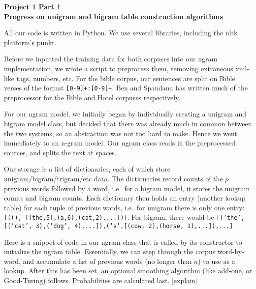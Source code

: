 \documentclass{article}
\begin{document}
\begin{center}\textbf{Project 1 Part 1\\Progress on unigram and bigram table construction algorithms}\end{center}

All our code is written in Python. We use several libraries, including the nltk platform's punkt.\par

Before we inputted the training data for both corpuses into our ngram implementation, we wrote a script to preprocess them, removing extraneous xml-like tags, numbers, etc. For the bible corpus, our sentences are split on Bible verses of the format \texttt{[0-9]+:[0-9]+}. Ben and Spandana has written much of the preprocessor for the Bible and Hotel corpuses respectively.\par

For our ngram model, we initially began by individually creating a unigram and bigram model class, but decided that there was already much in common between the two systems, so an abstraction was not too hard to make. Hence we went immediately to an n-gram model. Our ngram class reads in the preprocessed sources, and splits the text at spaces.\par

Our storage is a list of dictionaries, each of which store unigram/bigram/trigram/etc data. The dictionaries record counts of the $p$ previous words followed by a word, i.e.\ for a bigram model, it stores the unigram counts and bigram counts. Each dictionary then holds an entry (another lookup table) for each tuple of previous words, i.e.\ for unigram there is only one entry: \texttt{[((), [(the,5),(a,6),(cat,2),...])]}. For bigram, there would be \texttt{[('the',[('cat', 3),('dog', 4),...]),('a',[(cow, 2),(horse, 1),...]),...]}\par

Here is a snippet of code in our ngram class that is called by its constructor to initialize the ngram table. Essentially, we can step through the corpus word-by-word, and accumulate a list of previous words (no longer than $n$) to use as a lookup. After this has been set, an optional smoothing algorithm (like add-one, or Good-Turing) follows. Probabilities are calculated last. [explain]
\end{document}
